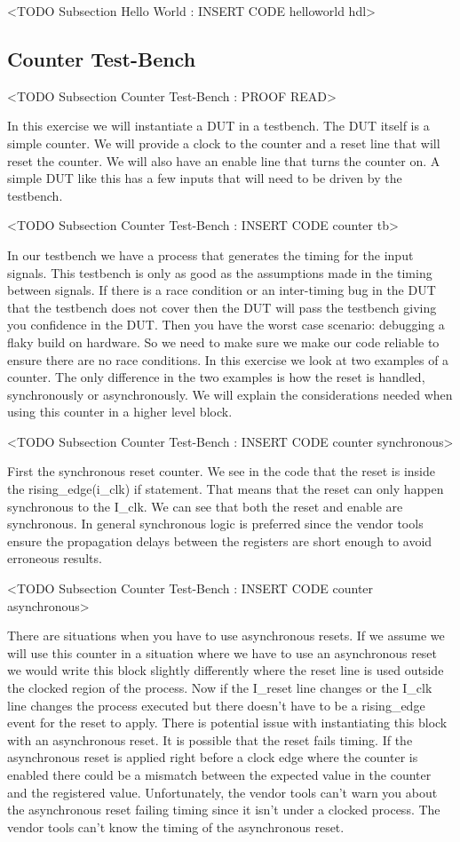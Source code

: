 	<TODO Subsection Hello World : INSERT CODE helloworld hdl>
	
	
\subsection{Counter Test-Bench}
	<TODO Subsection Counter Test-Bench : PROOF READ>

In this exercise we will instantiate a \ac{DUT} in a testbench. The \ac{DUT} itself is a simple counter. We will provide a clock to the counter and a reset line that will reset the counter. We will also have an enable line that turns the counter on. A simple \ac{DUT} like this has a few inputs that will need to be driven by the testbench.      

    <TODO Subsection Counter Test-Bench : INSERT CODE counter tb>

In our testbench we have a process that generates the timing for the input signals. This testbench is only as good as the assumptions made in the timing between signals. If there is a race condition or an inter-timing bug in the \ac{DUT} that the testbench does not cover then the \ac{DUT} will pass the testbench giving you confidence in the \ac{DUT}. Then you have the worst case scenario: debugging a flaky build on hardware. So we need to make sure we make our code reliable to ensure there are no race conditions. In this exercise we look at two examples of a counter. The only difference in the two examples is how the reset is handled, synchronously or asynchronously. We will explain the considerations needed when using this counter in a higher level block.      

    <TODO Subsection Counter Test-Bench : INSERT CODE counter synchronous>

First the synchronous reset counter. We see in the code that the reset is inside the rising_edge(i_clk) if statement. That means that the reset can only happen synchronous to the I_clk. We can see that both the reset and enable are synchronous. In general synchronous logic is preferred since the vendor tools ensure the propagation delays between the registers are short enough to avoid erroneous results.

    <TODO Subsection Counter Test-Bench : INSERT CODE counter asynchronous>

There are situations when you have to use asynchronous resets. If we assume we will use this counter in a situation where we have to use an asynchronous reset we would write this block slightly differently where the reset line is used outside the clocked region of the process. Now if the I_reset line changes or the I_clk line changes the process executed but there doesn't have to be a rising_edge event for the reset to apply. There is potential issue with instantiating this block with an asynchronous reset. It is possible that the reset fails timing. If the asynchronous reset is applied right before a clock edge where the counter is enabled there could be a mismatch between the expected value in the counter and the registered value. Unfortunately, the vendor tools can't warn you about the asynchronous reset failing timing since it isn't under a clocked process. The vendor tools can't know the timing of the asynchronous reset.	
	
